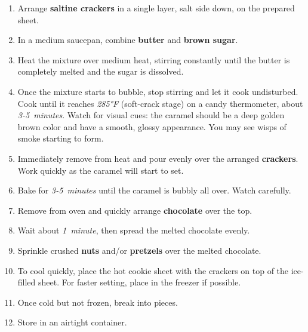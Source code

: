 \documentclass[11pt,letterpaper]{article}
\begin{document}
\begin{enumerate}
    \item Arrange \textbf{saltine crackers} in a single layer, salt side down, on the prepared sheet.
    \item In a medium saucepan, combine \textbf{butter} and \textbf{brown sugar}.
    \item Heat the mixture over medium heat, stirring constantly until the butter is completely melted and the sugar is dissolved.
    \item Once the mixture starts to bubble, stop stirring and let it cook undisturbed. Cook until it reaches \textit{285°F} (soft-crack stage) on a candy thermometer, about \textit{3-5~minutes}. Watch for visual cues: the caramel should be a deep golden brown color and have a smooth, glossy appearance. You may see wisps of smoke starting to form.
    \item Immediately remove from heat and pour evenly over the arranged \textbf{crackers}. Work quickly as the caramel will start to set.
    \item Bake for \textit{3-5~minutes} until the caramel is bubbly all over. Watch carefully.
    \item Remove from oven and quickly arrange \textbf{chocolate} over the top.
    \item Wait about \textit{1~minute}, then spread the melted chocolate evenly.
    \item Sprinkle crushed \textbf{nuts} and/or \textbf{pretzels} over the melted chocolate.
    \item To cool quickly, place the hot cookie sheet with the crackers on top of the ice-filled sheet. For faster setting, place in the freezer if possible.
    \item Once cold but not frozen, break into pieces.
    \item Store in an airtight container.
\end{enumerate}
\end{document}
